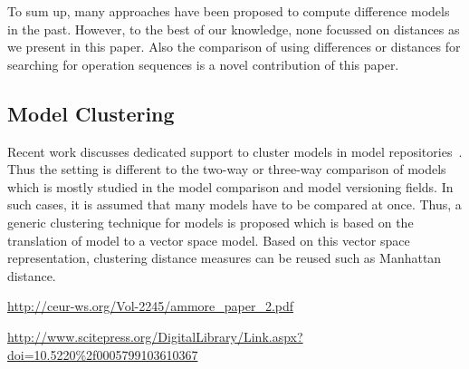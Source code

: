 To sum up, many approaches have been proposed to compute difference models in the past. However, to the best of our knowledge, none focussed on distances as we present in this paper. Also the comparison of using differences or distances for searching for operation sequences is a novel contribution of this paper. 

\subsection{Model Clustering}

Recent work discusses dedicated support to cluster models in model repositories~\cite{}. Thus the setting is different to the two-way or three-way comparison of models which is mostly studied in the model comparison and model versioning fields. In such cases, it is assumed that many models have to be compared at once. Thus, a generic clustering technique for models is proposed which is based on the translation of model to a vector space model. Based on this vector space representation, clustering distance measures can be reused such as Manhattan distance.

\url{http://ceur-ws.org/Vol-2245/ammore_paper\_2.pdf}

\url{http://www.scitepress.org/DigitalLibrary/Link.aspx?doi=10.5220\%2f0005799103610367}

